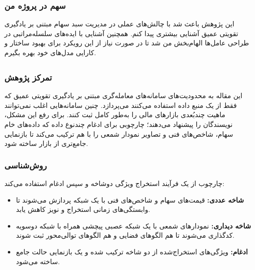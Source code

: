 \documentclass[12pt, a4paper]{report}
\begin{document}
\subsubsection{سهم در پروژه من}
این پژوهش باعث شد با چالش‌های عملی در مدیریت سبد سهام مبتنی بر یادگیری تقویتی عمیق آشنایی بیشتری پیدا کنم. همچنین آشنایی با ایده‌های سلسله‌مراتبی در طراحی عامل‌ها الهام‌بخش من شد تا در صورت نیاز از این رویکرد برای بهبود ساختار و کارایی مدل‌های خود بهره بگیرم.


\subsection{ \cite{liu2022msf_drl}}

\subsubsection{تمرکز پژوهش}
این مقاله به محدودیت‌های سامانه‌های معامله‌گری مبتنی بر یادگیری تقویتی عمیق که فقط از یک منبع داده استفاده می‌کنند می‌پردازد. چنین سامانه‌هایی اغلب نمی‌توانند ماهیت چندبُعدی بازارهای مالی را به‌طور کامل ثبت کنند. برای رفع این مشکل، نویسندگان  را پیشنهاد می‌دهند؛ چارچوبی برای ادغام چندنوع داده که داده‌های خام سهام، شاخص‌های فنی و تصاویر نمودار شمعی را با هم ترکیب می‌کند تا بازنمایی جامع‌تری از بازار ساخته شود.

\subsubsection{روش‌شناسی}
چارچوب  از یک فرآیند استخراج ویژگی دو‌شاخه و سپس ادغام استفاده می‌کند:
\begin{itemize}
    \item \textbf{شاخه عددی:} قیمت‌های سهام و شاخص‌های فنی با یک شبکه  پردازش می‌شوند تا وابستگی‌های زمانی استخراج و نویز کاهش یابد.  
    \item \textbf{شاخه دیداری:} نمودارهای شمعی با یک شبکه عصبی پیچشی همراه با شبکه  دوسویه کدگذاری می‌شوند تا هم الگوهای فضایی و هم الگوهای توالی‌محور ثبت شوند.  
    \item \textbf{ادغام:} ویژگی‌های استخراج‌شده از دو شاخه ترکیب شده و یک بازنمایی حالت جامع ساخته می‌شود.  
\end{itemize}
\end{document}
